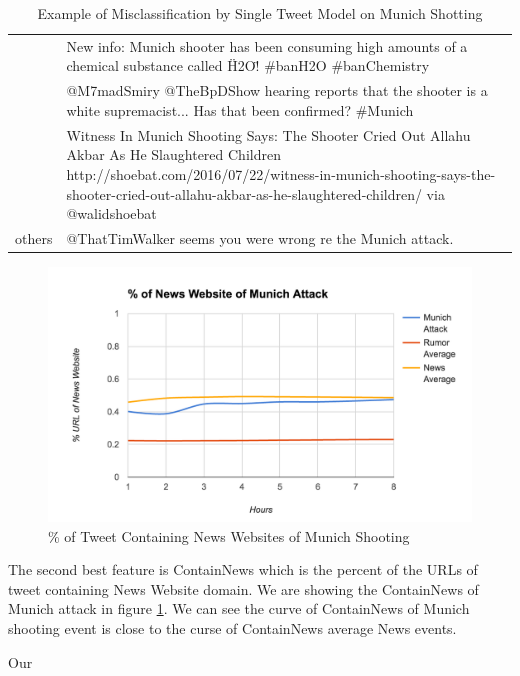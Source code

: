 \begin{table}[!h]
{\begin{tabular}{@{\textbf{ }}cp{350pt}@{}}
			& New info: Munich shooter has been consuming high amounts of a chemical substance called \"H2O\"! \#banH2O \#banChemistry \\\cline{2-2}
			& @M7madSmiry @TheBpDShow hearing reports that the shooter is a white supremacist... Has that been confirmed? \#Munich\\\cline{2-2}
			& Witness In Munich Shooting Says: The Shooter Cried Out Allahu Akbar As He Slaughtered Children http://shoebat.com/2016/07/22/witness-in-munich-shooting-says-the-shooter-cried-out-allahu-akbar-as-he-slaughtered-children/  via @walidshoebat\\\midrule
others &	@ThatTimWalker seems you were wrong re the Munich attack.\\
		
 			\bottomrule

\end{tabular}}
\caption{Example of Misclassification by Single Tweet Model on Munich Shotting}
\label{tab:Munshot}
\end{table}
  \begin{figure}[!h]
\centering
\includegraphics[width=0.8\columnwidth]{images/munichNews.png}
\caption{\% of Tweet Containing News Websites of Munich Shooting}
\label{fig:munichattackNews}
\end{figure}

The second best feature is ContainNews which is the percent of the URLs of tweet containing News Website domain. We are showing the ContainNews of Munich attack in figure \ref{fig:munichattackNews}. 
 We can see the curve of ContainNews of Munich shooting event is close to the curse of ContainNews average News events. 
 
 Our 
